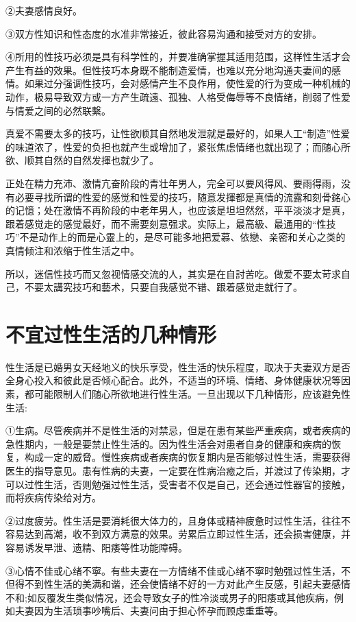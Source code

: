 \documentclass[12pt,UTF8]{ctexbook}
\begin{document}
②夫妻感情良好。

③双方性知识和性态度的水准非常接近，彼此容易沟通和接受对方的安排。

④所用的性技巧必须是具有科学性的，并要准确掌握其适用范围，这样性生活才会产生有益的效果。但性技巧本身既不能制造爱情，也难以充分地沟通夫妻间的感情。如果过分强调性技巧，会对感情产生不良作用，使性爱的行为变成一种机械的动作，极易导致双方或一方产生疏遠、孤独、人格受侮辱等不良情绪，削弱了性爱与情爱之间的必然联繫。

真爱不需要太多的技巧，让性欲顺其自然地发泄就是最好的，如果人工“制造”性爱的味道浓了，性爱的负担也就产生或增加了，紧张焦虑情绪也就出现了；而随心所欲、顺其自然的自然发揮也就少了。

正处在精力充沛、激情亢奋阶段的青壮年男人，完全可以要风得风、要雨得雨，没有必要寻找所谓的性爱的感觉和性爱的技巧，随意发揮都是真情的流露和刻骨銘心的记憶；处在激情不再阶段的中老年男人，也应该是坦坦然然，平平淡淡才是真，跟着感觉走的感觉最好，而不需要刻意强求。实际上，最高級、最通用的“性技巧”不是动作上的而是心靈上的，是尽可能多地把爱慕、依戀、亲密和关心之类的真情倾注和浓缩于性生活之中。

所以，迷信性技巧而又忽视情感交流的人，其实是在自討苦吃。做爱不要太苛求自己，不要太講究技巧和藝术，只要自我感觉不错、跟着感觉走就行了。

\section{不宜过性生活的几种情形}


性生活是已婚男女天经地义的快乐享受，性生活的快乐程度，取决于夫妻双方是否全身心投入和彼此是否倾心配合。此外，不适当的环境、情绪、身体健康状况等因素，都可能限制人们随心所欲地进行性生活。一旦出现以下几种情形，应该避免性生活:

①生病。尽管疾病并不是性生活的对禁忌，但是在患有某些严重疾病，或者疾病的急性期内，一般是要禁止性生活的。因为性生活会对患者自身的健康和疾病的恢复，构成一定的威脅。慢性疾病或者疾病的恢复期内是否能够过性生活，需要获得医生的指导意见。患有性病的夫妻，一定要在性病治癒之后，并渡过了传染期，才可以过性生活，否则勉强过性生活，受害者不仅是自己，还会通过性器官的接触，而将疾病传染给对方。

②过度疲劳。性生活是要消耗很大体力的，且身体或精神疲惫时过性生活，往往不容易达到高潮，收不到双方满意的效果。劳累后立即过性生活，还会损害健康，并容易诱发早泄、遗精、阳痿等性功能障碍。

③心情不佳或心绪不寧。有些夫妻在一方情绪不佳或心绪不寧时勉强过性生活，不但得不到性生活的美满和谐，还会使情绪不好的一方对此产生反感，引起夫妻感情不和;如反覆发生类似情况，还会导致女子的性冷淡或男子的阳痿或其他疾病，例如夫妻因为生活琐事吵嘴后、夫妻问由于担心怀孕而顾虑重重等。
\end{document}
